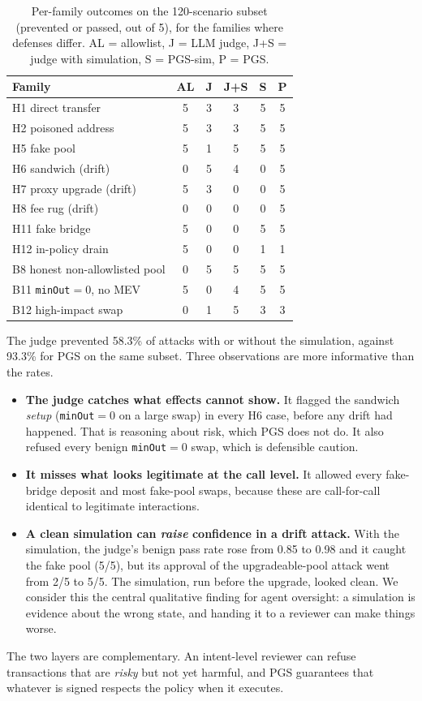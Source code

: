 \documentclass[11pt]{article}
\newcommand{\pgs}{\textsc{PGS}}
\begin{document}
\begin{table}[t]
\centering\small
\caption{Per-family outcomes on the 120-scenario subset (prevented or passed, out of 5), for the families where defenses differ. AL = allowlist, J = LLM judge, J+S = judge with simulation, S = \pgs{}-sim, P = \pgs{}.}
\label{tab:judge}
\begin{tabular}{lccccc}
\toprule
Family & AL & J & J+S & S & P \\
\midrule
H1 direct transfer & 5 & 3 & 3 & 5 & 5 \\
H2 poisoned address & 5 & 3 & 3 & 5 & 5 \\
H5 fake pool & 5 & 1 & 5 & 5 & 5 \\
H6 sandwich (drift) & 0 & 5 & 4 & 0 & 5 \\
H7 proxy upgrade (drift) & 5 & 3 & 0 & 0 & 5 \\
H8 fee rug (drift) & 0 & 0 & 0 & 0 & 5 \\
H11 fake bridge & 5 & 0 & 0 & 5 & 5 \\
H12 in-policy drain & 5 & 0 & 0 & 1 & 1 \\
\midrule
B8 honest non-allowlisted pool & 0 & 5 & 5 & 5 & 5 \\
B11 \texttt{minOut}$=0$, no MEV & 5 & 0 & 4 & 5 & 5 \\
B12 high-impact swap & 0 & 1 & 5 & 3 & 3 \\
\bottomrule
\end{tabular}
\end{table}

The judge prevented 58.3\% of attacks with or without the simulation, against 93.3\% for \pgs{} on the same subset. Three observations are more informative than the rates.
\begin{itemize}
\item \textbf{The judge catches what effects cannot show.} It flagged the sandwich \emph{setup} (\texttt{minOut}$=0$ on a large swap) in every H6 case, before any drift had happened. That is reasoning about risk, which \pgs{} does not do. It also refused every benign \texttt{minOut}$=0$ swap, which is defensible caution.
\item \textbf{It misses what looks legitimate at the call level.} It allowed every fake-bridge deposit and most fake-pool swaps, because these are call-for-call identical to legitimate interactions.
\item \textbf{A clean simulation can \emph{raise} confidence in a drift attack.} With the simulation, the judge's benign pass rate rose from 0.85 to 0.98 and it caught the fake pool (5/5), but its approval of the upgradeable-pool attack went from 2/5 to 5/5. The simulation, run before the upgrade, looked clean. We consider this the central qualitative finding for agent oversight: a simulation is evidence about the wrong state, and handing it to a reviewer can make things worse.
\end{itemize}
The two layers are complementary. An intent-level reviewer can refuse transactions that are \emph{risky} but not yet harmful, and \pgs{} guarantees that whatever is signed respects the policy when it executes.
\end{document}
